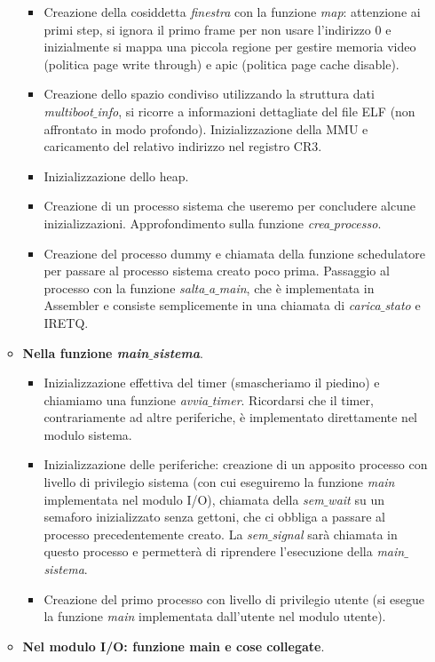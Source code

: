 \documentclass[11pt]{report}
\theoremstyle{definition}
\begin{document}
\begin{itemize}
\begin{itemize}
\begin{itemize}
			\item Creazione della cosiddetta \emph{finestra} con la funzione \emph{map}: attenzione ai primi step, si ignora il primo frame per non usare l'indirizzo $0$ e inizialmente si mappa una piccola regione per gestire memoria video (politica page write through) e apic (politica page cache disable).
			\item Creazione dello spazio condiviso utilizzando la struttura dati \emph{multiboot$\_$info}, si ricorre a informazioni dettagliate del file ELF (non affrontato in modo profondo). Inizializzazione della MMU e caricamento del relativo indirizzo nel registro CR3.
			\item Inizializzazione dello heap.
			\item Creazione di un processo sistema che useremo per concludere alcune inizializzazioni. Approfondimento sulla funzione \emph{crea$\_$processo}.
			\item Creazione del processo dummy e chiamata della funzione schedulatore per passare al processo sistema creato poco prima. Passaggio al processo con la funzione \emph{salta$\_$a$\_$main}, che è implementata in Assembler e consiste semplicemente in una chiamata di \emph{carica$\_$stato} e IRETQ.
		\end{itemize}
		\item \textbf{Nella funzione \emph{main$\_$sistema}}.
		\begin{itemize}
			\item Inizializzazione effettiva del timer (smascheriamo il piedino) e chiamiamo una funzione \emph{avvia$\_$timer}. Ricordarsi che il timer, contrariamente ad altre periferiche, è implementato direttamente nel modulo sistema.
			\item Inizializzazione delle periferiche: creazione di un apposito processo con livello di privilegio sistema (con cui eseguiremo la funzione \emph{main} implementata nel modulo I/O), chiamata della \emph{sem$\_$wait} su un semaforo inizializzato senza gettoni, che ci obbliga a passare al processo precedentemente creato. La \emph{sem$\_$signal} sarà chiamata in questo processo e permetterà di riprendere l'esecuzione della \emph{main$\_$sistema}.
			\item Creazione del primo processo con livello di privilegio utente (si esegue la funzione \emph{main} implementata dall'utente nel modulo utente).
		\end{itemize}
		\item \textbf{Nel modulo I/O: funzione main e cose collegate}.
		\begin{itemize}

\end{itemize}
\end{itemize}
\end{itemize}
\end{document}
